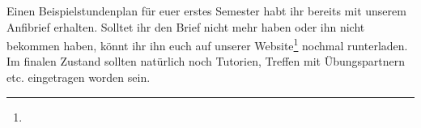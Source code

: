 Einen Beispielstundenplan für euer erstes Semester habt ihr bereits mit unserem
Anfibrief erhalten. Solltet ihr den Brief nicht mehr haben oder ihn nicht
bekommen haben, könnt ihr ihn euch auf unserer
Website\footnote{} nochmal runterladen.\\ 
Im finalen Zustand sollten natürlich noch Tutorien, Treffen mit Übungspartnern etc. eingetragen worden sein. 
